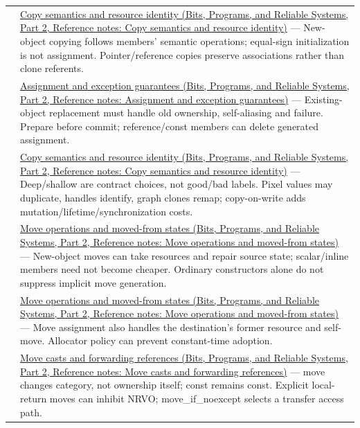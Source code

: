 {\begin{longtable}[]{@{}
  >{\raggedright\arraybackslash}p{}
  >{\raggedright\arraybackslash}p{}@{}}
137 & \href{../01-Bits-Programs-and-Reliable-Systems-P02/main.pdf\#nameddest=appendix-1340cd1ce582}{Copy semantics and resource identity (Bits, Programs, and Reliable Systems, Part 2, Reference notes: Copy semantics and resource identity)} --- New-object copying follows members' semantic operations; equal-sign initialization is not assignment. Pointer/reference copies preserve associations rather than clone referents. \\
138 & \href{../01-Bits-Programs-and-Reliable-Systems-P02/main.pdf\#nameddest=appendix-bea6beb5350f}{Assignment and exception guarantees (Bits, Programs, and Reliable Systems, Part 2, Reference notes: Assignment and exception guarantees)} --- Existing-object replacement must handle old ownership, self-aliasing and failure. Prepare before commit; reference/const members can delete generated assignment. \\
139 & \href{../01-Bits-Programs-and-Reliable-Systems-P02/main.pdf\#nameddest=appendix-1340cd1ce582}{Copy semantics and resource identity (Bits, Programs, and Reliable Systems, Part 2, Reference notes: Copy semantics and resource identity)} --- Deep/shallow are contract choices, not good/bad labels. Pixel values may duplicate, handles identify, graph clones remap; copy-on-write adds mutation/lifetime/synchronization costs. \\
140 & \href{../01-Bits-Programs-and-Reliable-Systems-P02/main.pdf\#nameddest=appendix-5636651017c2}{Move operations and moved-from states (Bits, Programs, and Reliable Systems, Part 2, Reference notes: Move operations and moved-from states)} --- New-object moves can take resources and repair source state; scalar/inline members need not become cheaper. Ordinary constructors alone do not suppress implicit move generation. \\
141 & \href{../01-Bits-Programs-and-Reliable-Systems-P02/main.pdf\#nameddest=appendix-5636651017c2}{Move operations and moved-from states (Bits, Programs, and Reliable Systems, Part 2, Reference notes: Move operations and moved-from states)} --- Move assignment also handles the destination's former resource and self-move. Allocator policy can prevent constant-time adoption. \\
142 & \href{../01-Bits-Programs-and-Reliable-Systems-P02/main.pdf\#nameddest=appendix-0104b704fb11}{Move casts and forwarding references (Bits, Programs, and Reliable Systems, Part 2, Reference notes: Move casts and forwarding references)} --- move changes category, not ownership itself; const remains const. Explicit local-return moves can inhibit NRVO; move\_if\_noexcept selects a transfer access path. \\

\end{longtable}}
